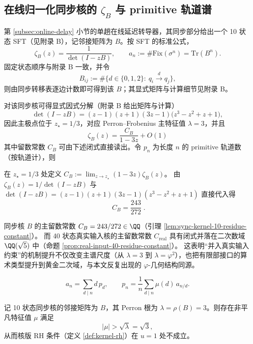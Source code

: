 \subsection{在线归一化同步核的 \texorpdfstring{$\zeta_B$}{zeta\_B} 与 primitive 轨道谱}\label{subsec:zeta-online-kernel}
第 \ref{subsec:online-delay} 小节的单趟在线延迟转导器，其同步部分给出一个 10 状态 SFT（见附录 B），记邻接矩阵为 $B$。按 SFT 的标准公式，
\[
\zeta_B(z)=\frac{1}{\det(I-zB)},\qquad
a_n:=\#\mathrm{Fix}(\sigma^n)=\mathrm{Tr}(B^n).
\]
固定状态顺序与附录 B 一致，并令
\[
B_{ij}:=\#\{d\in\{0,1,2\}:\ q_i\xrightarrow{d}q_j\},
\]
则由同步转移表逐边计数即可得到该 $B$；其显式矩阵与计算细节见附录 B。



对该同步核可得显式因式分解（附录 B 给出矩阵与计算）
\[
\det(I-zB)=(z-1)(z+1)(3z-1)\bigl(z^3-z^2+z+1\bigr),
\]
因此主极点位于 $z_\star=1/3$，对应 Perron--Frobenius 主特征值 $\lambda=3$，并且
\[
\zeta_B(z)=\frac{C_B}{1-3z}+O(1)
\]
其中留数常数 \(C_B\) 可由下述闭式直接读出。令 $p_n$ 为长度 $n$ 的 primitive 轨道数（按轨道计），则

\begin{remark}[10 状态同步核的主极点留数常数]\label{lem:sync-kernel-10-residue-constant}
在 \(z_\star=1/3\) 处定义
\(
C_B:=\lim_{z\to z_\star}(1-3z)\zeta_B(z)
\)。
由 \(\zeta_B(z)=1/\det(I-zB)\) 与
\(
\det(I-zB)=(z-1)(z+1)(3z-1)(z^3-z^2+z+1)
\)
直接代入得
\[
\boxed{\; C_B=\frac{243}{272}\; }.
\]
\end{remark}

\begin{remark}\label{rem:residue-field-sync-vs-real}
同步核 \(B\) 的主留数常数 \(C_B=243/272\in\QQ\)（引理 \ref{lem:sync-kernel-10-residue-constant}）。
而 40 状态真实输入核的主留数常数 \(C_{\mathrm{real}}\) 具有闭式并落在二次数域 \(\QQ(\sqrt5)\) 中（命题 \ref{prop:real-input-40-residue-constant}）。
这表明“并入真实输入约束”的机制提升不仅改变主谱尺度（从 \(\lambda=3\) 到 \(\lambda=\varphi^2\)），也把有限部接口的算术类型提升到黄金二次域，与本文反复出现的 \(\varphi\)-几何结构同源。
\end{remark}
\[
a_n=\sum_{d\mid n} d\,p_d,
\qquad
p_n=\frac{1}{n}\sum_{d\mid n}\mu(d)\,a_{n/d}.
\]

\begin{remark}[10 状态同步核不满足核版 RH（\texorpdfstring{$u=1$}{u=1}）]\label{prop:sync-kernel-10-nonrh}
记 10 状态同步核的邻接矩阵为 $B$，其 Perron 根为 $\lambda=\rho(B)=3$。则存在非平凡特征值 $\mu$ 满足
\[
|\mu|>\sqrt{\lambda}=\sqrt{3},
\]
从而核版 RH 条件（定义 \ref{def:kernel-rh}）在 $u=1$ 处不成立。
\end{remark}

